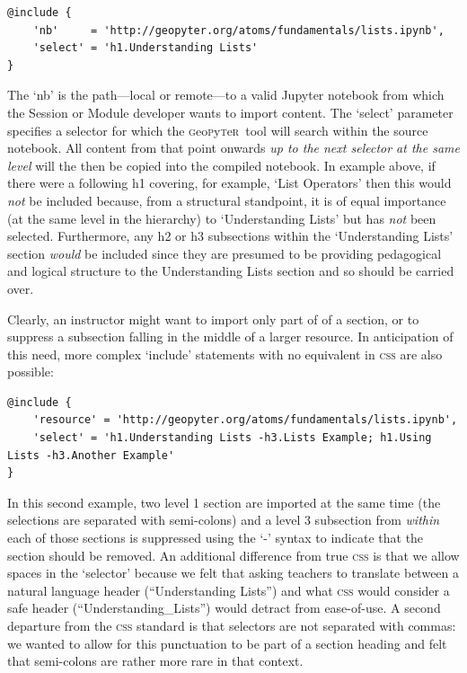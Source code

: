 \documentclass[letter, 11pt]{article}
\newcommand{\gp}{\textsc{g}eo\textsc{p}y\textsc{t}e\textsc{r}~\/}
\begin{document}
\begin{Verbatim}[fontsize=\small]
@include {
    'nb'     = 'http://geopyter.org/atoms/fundamentals/lists.ipynb',
    'select' = 'h1.Understanding Lists'
}
\end{Verbatim}

The `nb' is the path---local or remote---to a valid Jupyter notebook from which
the Session or Module developer wants to import content. The `select' parameter
specifies a selector for which the \gp tool will search within the source
notebook. All content from that point onwards \emph{up to the next selector at
the same level} will the then be copied into the compiled notebook. In example
above, if there were a following h1 covering, for example, `List Operators' then
this would \emph{not} be included because, from a structural standpoint, it is
of equal importance (at the same level in the hierarchy) to `Understanding
Lists' but has \emph{not} been selected. Furthermore, any h2 or h3 subsections
within the `Understanding Lists' section \textit{would} be included since they
are presumed to be providing pedagogical and logical structure to the
Understanding Lists section and so should be carried over.

Clearly, an instructor might want to import only part of of a section, or to
suppress a subsection falling in the middle of a larger resource. In
anticipation of this need, more complex `include' statements with no equivalent
in \textsc{css} are also possible:

\begin{Verbatim}[fontsize=\small]
@include {
    'resource' = 'http://geopyter.org/atoms/fundamentals/lists.ipynb',
    'select' = 'h1.Understanding Lists -h3.Lists Example; h1.Using Lists -h3.Another Example'
}
\end{Verbatim}

In this second example, two level 1 section are imported at the same time (the
selections are separated with semi-colons) and a level 3 subsection from
\emph{within} each of those sections is suppressed using the `-' syntax to
indicate that the section should be removed. An additional difference from true
\textsc{css} is that we allow spaces in the `selector' because we felt that
asking teachers to translate between a natural language header (``Understanding
Lists'') and what \textsc{css} would consider a safe header
(``Understanding\_Lists'') would detract from ease-of-use. A second departure
from the \textsc{css} standard is that selectors are not separated with commas:
we wanted to allow for this punctuation to be part of a section heading and felt
that semi-colons are rather more rare in that context.
\end{document}
